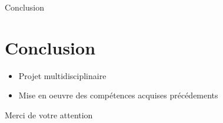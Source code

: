 \documentclass{beamer}
\begin{document}
	\begin{frame}{Conclusion}
	\section*{Conclusion}
	\begin{itemize}
		    \item Projet multidisciplinaire
		    \item Mise en oeuvre des compétences acquises précédements
		\end{itemize}
	\end{frame}
	\author[]{Florian POUTHIER - Tristan DRUSSEL}
	\begin{frame}[plain]{Merci de votre attention}
	\section*{}
		\titlepage
	\end{frame}
\end{document}
